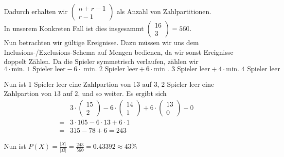 \documentclass[11pt,a4paper,ngerman]{article}
\begin{document}
Dadurch erhalten wir $\left( \begin{array}{cc} n + r - 1 \\ r - 1\end{array}\right)$ als Anzahl von Zahlpartitionen.\\ In unserem Konkreten Fall ist dies
insgesammt $\begin{pmatrix} 16 \\ 3 \end{pmatrix} = 560$.\\

Nun betrachten wir gültige Ereignisse. Dazu müssen wir uns dem Inclusions-/Exclusions-Schema auf Mengen bedienen, da wir sonst Ereignisse doppelt Zählen.
Da die Spieler symmetrisch verlaufen, zählen wir
\[
    4 \cdot \text{min. 1 Spieler leer} - 6 \cdot \text{ min. 2 Spieler leer} + 6 \cdot \text{min . 3 Spieler leer} + 4 \cdot \text{min. 4 Spieler leer}
\]

Nun ist 1 Spieler leer eine Zahlpartion von $13$ auf $3$, 2 Spieler leer eine Zahlpartion von $13$ auf $2$, und so weiter. Es ergibt sich
\[\begin{array}{ll}
    &3 \cdot \begin{pmatrix} 15 \\ 2\end{pmatrix} - 6 \cdot \begin{pmatrix} 14 \\ 1 \end{pmatrix} + 6 \cdot \begin{pmatrix} 13 \\ 0 \end{pmatrix} - 0\\
    = & 3 \cdot 105 - 6 \cdot 13 + 6 \cdot 1\\
    = & 315 - 78 + 6 = 243
\end{array}\]

Nun ist $P(X) = \frac{|X|}{|\Omega|} = \frac{243}{560} = 0.43392 \approx 43 \%$


\label{LastPage}
\end{document}
